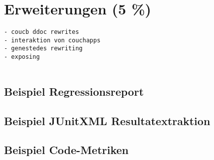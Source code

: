 \chapter{Erweiterungen (5 \%)}

\begin{verbatim}
- coucb ddoc rewrites
- interaktion von couchapps
- genestedes rewriting
- exposing


\end{verbatim}


\section{Beispiel Regressionsreport}
\section{Beispiel JUnitXML Resultatextraktion}
\section{Beispiel Code-Metriken}
